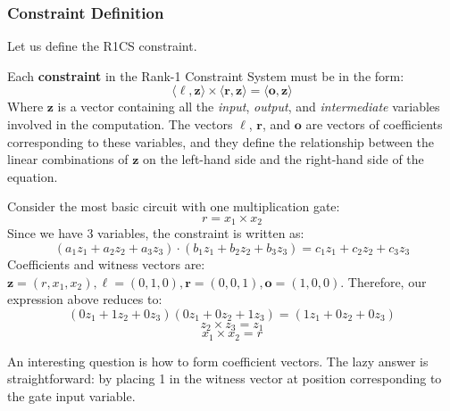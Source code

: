 \documentclass[../../book.tex]{subfiles}
\begin{document}
\subsubsection{Constraint Definition}
Let us define the R1CS constraint.

\begin{definition}
    Each \textbf{constraint} in the Rank-1 Constraint System must be in the form:
    \begin{equation*}
        \langle \boldsymbol{\ell}, \mathbf{z}\rangle \times \langle \boldsymbol{r}, \mathbf{z}\rangle = \langle \boldsymbol{o}, \mathbf{z}\rangle
    \end{equation*}
    Where $\mathbf{z}$ is a vector containing all the \textit{input}, \textit{output}, and 
    \textit{intermediate} variables involved in the computation. The vectors $\boldsymbol{\ell}$, 
    $\boldsymbol{r}$, and $\boldsymbol{o}$ are vectors of coefficients corresponding to these variables, 
    and they define the relationship between the linear combinations of $\mathbf{z}$ on the 
    left-hand side and the right-hand side of the equation.
\end{definition}

\begin{example}
    Consider the most basic circuit with one multiplication gate:
    \begin{equation*}
        r = x_1 \times x_2
    \end{equation*}
    Since we have $3$ variables, the constraint is written as:
    \[(a_1z_1 + a_2z_2 + a_3z_3) \cdot (b_1z_1 + b_2z_2 + b_3z_3) = c_1z_1 + c_2z_2 + c_3z_3\]
    Coefficients and witness vectors are:
    $\mathbf{z} = (r, x_1, x_2), \boldsymbol{\ell} = (0, 1, 0), \boldsymbol{r} = (0, 0, 1), \boldsymbol{o} = (1, 0, 0)$. Therefore, our expression above reduces to:
    \[ (0z_1 + 1z_2 + 0z_3)(0z_1 + 0z_2 + 1z_3) = (1z_1 + 0z_2 + 0z_3) \]
    \[ z_2 \times z_3 = z_1 \]
    \[ x_1 \times x_2 = r \]
\end{example}

An interesting question is how to form coefficient vectors. The lazy answer is
straightforward: by placing 1 in the witness vector at position corresponding to
the gate input variable. 

\vspace{-0.5em}
\end{document}
